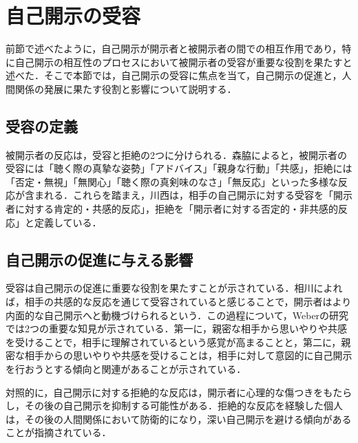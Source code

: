\section{自己開示の受容}\label{受容}

前節で述べたように，自己開示が開示者と被開示者の間での相互作用であり，特に自己開示の相互性のプロセスにおいて被開示者の受容が重要な役割を果たすと述べた．そこで本節では，自己開示の受容に焦点を当て，自己開示の促進と，人間関係の発展に果たす役割と影響について説明する．


\subsection{受容の定義}

被開示者の反応は，受容と拒絶の2つに分けられる．森脇\cite{森脇_2005}によると，被開示者の受容には「聴く際の真摯な姿勢」「アドバイス」「親身な行動」「共感」，拒絶には「否定・無視」「無関心」「聴く際の真剣味のなさ」「無反応」といった多様な反応が含まれる．これらを踏まえ，川西は，相手の自己開示に対する受容を「開示者に対する肯定的・共感的反応」，拒絶を「開示者に対する否定的・非共感的反応」と定義している．


\subsection{自己開示の促進に与える影響}\label{}

受容は自己開示の促進に重要な役割を果たすことが示されている．相川\cite{相川充_2010}によれば，相手の共感的な反応を通じて受容されていると感じることで，開示者はより内面的な自己開示へと動機づけられるという．この過程について，Weber\cite{weber_2004}の研究では2つの重要な知見が示されている．第一に，親密な相手から思いやりや共感を受けることで，相手に理解されているという感覚が高まることと，第二に，親密な相手からの思いやりや共感を受けることは，相手に対して意図的に自己開示を行おうとする傾向と関連があることが示されている．

対照的に，自己開示に対する拒絶的な反応は，開示者に心理的な傷つきをもたらし，その後の自己開示を抑制する可能性がある．拒絶的な反応を経験した個人は，その後の人間関係において防衛的になり，深い自己開示を避ける傾向があることが指摘されている．

